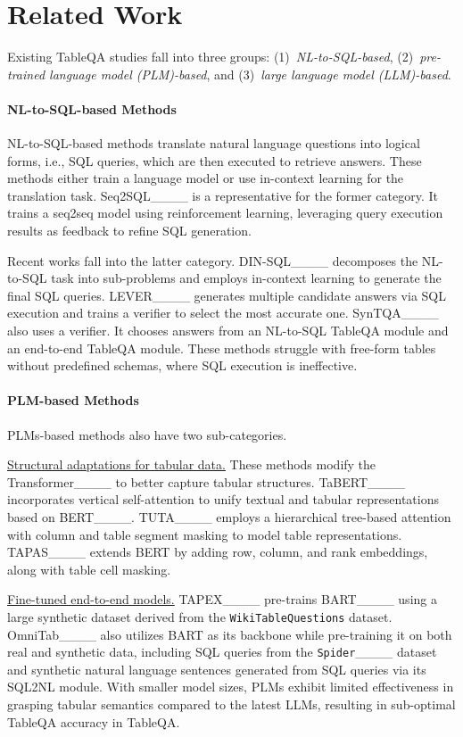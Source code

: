 \section{Related Work}
Existing TableQA studies fall into three groups: 
(1)~\emph{NL-to-SQL-based}, (2)~\emph{pre-trained language model (PLM)-based}, and (3)~\emph{large language model (LLM)-based}.


\paragraph{NL-to-SQL-based Methods} NL-to-SQL-based methods translate natural language questions into logical forms, i.e., SQL queries, which are then executed to retrieve answers. These methods either train a language model or use in-context learning for the translation task. Seq2SQL____ is a representative for the former category. It trains a seq2seq model using reinforcement learning, leveraging query execution results as feedback to refine SQL generation. 

Recent works fall into the latter category. DIN-SQL____ decomposes the NL-to-SQL task into sub-problems and employs in-context learning to generate the final SQL queries. LEVER____ generates multiple candidate answers via SQL execution and trains a verifier to select the most accurate one. SynTQA____ also uses a verifier. It chooses answers from an NL-to-SQL TableQA module and an end-to-end TableQA module. These methods 
struggle with free-form tables without predefined schemas, where SQL execution is ineffective.


\paragraph{PLM-based Methods} PLMs-based methods also have two sub-categories.

\underline{Structural adaptations for tabular data.} These methods modify the Transformer____ to better capture tabular structures. TaBERT____ incorporates vertical self-attention to unify textual and tabular representations based on BERT____. TUTA____ employs a hierarchical tree-based attention with column and table segment masking to model table representations. TAPAS____ extends BERT by adding row, column, and rank embeddings, along with table cell masking.

\underline{Fine-tuned end-to-end models.} TAPEX____ pre-trains BART____ using a large synthetic dataset derived from the \texttt{WikiTableQuestions} dataset. 
OmniTab____ also utilizes BART as its backbone  
while pre-training it on both real and synthetic data, 
including SQL queries from the \texttt{Spider}____ dataset and synthetic natural language sentences generated from SQL queries via its SQL2NL module. 
With smaller model sizes, PLMs exhibit limited effectiveness in grasping tabular semantics compared to the latest LLMs, resulting in sub-optimal TableQA accuracy in TableQA.


